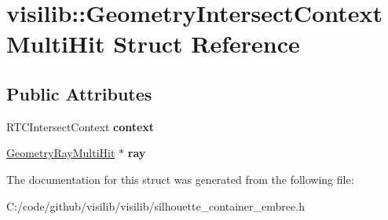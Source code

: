 \hypertarget{structvisilib_1_1_geometry_intersect_context_multi_hit}{}\section{visilib\+::Geometry\+Intersect\+Context\+Multi\+Hit Struct Reference}
\label{structvisilib_1_1_geometry_intersect_context_multi_hit}
\subsection*{Public Attributes}
\begin{DoxyCompactItemize}
\item 
\mbox{\label{structvisilib_1_1_geometry_intersect_context_multi_hit_adba46f2fcac02da50667f26d19b92beb}} 
R\+T\+C\+Intersect\+Context {\bfseries context}
\item 
\mbox{\label{structvisilib_1_1_geometry_intersect_context_multi_hit_a96815be3c2cee4068ed365a5299cf0a6}} 
\mbox{\hyperlink{structvisilib_1_1_geometry_ray_multi_hit}{Geometry\+Ray\+Multi\+Hit}} $\ast$ {\bfseries ray}
\end{DoxyCompactItemize}


The documentation for this struct was generated from the following file\+:\begin{DoxyCompactItemize}
\item 
C\+:/code/github/visilib/visilib/silhouette\+\_\+container\+\_\+embree.\+h\end{DoxyCompactItemize}
